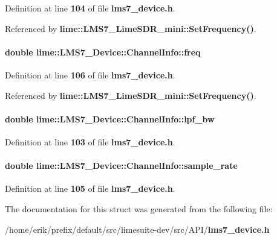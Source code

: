Definition at line {\bf 104} of file {\bf lms7\+\_\+device.\+h}.



Referenced by {\bf lime\+::\+L\+M\+S7\+\_\+\+Lime\+S\+D\+R\+\_\+mini\+::\+Set\+Frequency()}.

\paragraph[{freq}]{\setlength{\rightskip}{0pt plus 5cm}double lime\+::\+L\+M\+S7\+\_\+\+Device\+::\+Channel\+Info\+::freq}\label{structlime_1_1LMS7__Device_1_1ChannelInfo_a327d1c7a5cf3dd917283221f71da7bc3}


Definition at line {\bf 106} of file {\bf lms7\+\_\+device.\+h}.



Referenced by {\bf lime\+::\+L\+M\+S7\+\_\+\+Lime\+S\+D\+R\+\_\+mini\+::\+Set\+Frequency()}.

\paragraph[{lpf\+\_\+bw}]{\setlength{\rightskip}{0pt plus 5cm}double lime\+::\+L\+M\+S7\+\_\+\+Device\+::\+Channel\+Info\+::lpf\+\_\+bw}\label{structlime_1_1LMS7__Device_1_1ChannelInfo_a65022990af0bfb84e119938bd3892c23}


Definition at line {\bf 103} of file {\bf lms7\+\_\+device.\+h}.

\paragraph[{sample\+\_\+rate}]{\setlength{\rightskip}{0pt plus 5cm}double lime\+::\+L\+M\+S7\+\_\+\+Device\+::\+Channel\+Info\+::sample\+\_\+rate}\label{structlime_1_1LMS7__Device_1_1ChannelInfo_a247d4a31f9f379f0fd8d8cbc04f121f6}


Definition at line {\bf 105} of file {\bf lms7\+\_\+device.\+h}.



The documentation for this struct was generated from the following file\+:\begin{DoxyCompactItemize}
\item 
/home/erik/prefix/default/src/limesuite-\/dev/src/\+A\+P\+I/{\bf lms7\+\_\+device.\+h}\end{DoxyCompactItemize}
